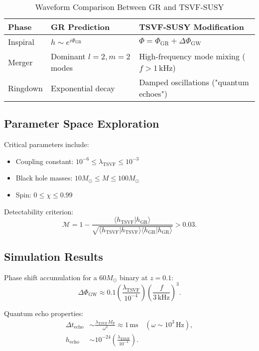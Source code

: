 \documentclass[12pt, onecolumn]{article}
\newcommand{\TSVF}{\lambda_{\text{TSVF}}}
\newcommand{\MP}{M_{\mathrm{P}}}
\theoremstyle{definition}
\numberwithin{equation}{section}
\begin{document}
\begin{table}[ht]
\centering
\caption{Waveform Comparison Between GR and TSVF-SUSY}\label{tab:wave-compare}
\begin{tabular}{@{}lll@{}}
\toprule
\textbf{Phase} & \textbf{GR Prediction} & \textbf{TSVF-SUSY Modification} \\
\midrule
Inspiral & \( h \sim e^{i\Phi_{\text{GR}}} \) & \( \Phi = \Phi_{\text{GR}} + \Delta\Phi_{\text{GW}} \) \\
Merger & Dominant \( l=2, m=2 \) modes & High-frequency mode mixing (\( f > 1\,\text{kHz} \)) \\
Ringdown & Exponential decay & Damped oscillations ("quantum echoes") \\
\bottomrule
\end{tabular}
\end{table}


\subsection{Parameter Space Exploration}\label{subsec:parameters}
Critical parameters include:
\begin{itemize}
\item Coupling constant: \( 10^{-6} \leq \TSVF \leq 10^{-3} \)
\item Black hole masses: \( 10 M_\odot \leq M \leq 100 M_\odot \)
\item Spin: \( 0 \leq \chi \leq 0.99 \)
\end{itemize}

Detectability criterion:
\begin{equation}\label{eq:mismatch}
\mathcal{M} = 1 - \frac{\langle h_{\text{TSVF}} | h_{\text{GR}} \rangle}{\sqrt{\langle h_{\text{TSVF}} | h_{\text{TSVF}} \rangle \langle h_{\text{GR}} | h_{\text{GR}} \rangle}} > 0.03.
\end{equation}


\subsection{Simulation Results}\label{subsec:results}
Phase shift accumulation for a \( 60 M_\odot \) binary at \( z=0.1 \):
\begin{equation}\label{eq:phase-shift}
\Delta \Phi_{\text{GW}} \approx 0.1 \left(\frac{\TSVF}{10^{-4}}\right) \left(\frac{f}{3\,\text{kHz}}\right)^3.
\end{equation}

Quantum echo properties:
\begin{align}
\Delta t_{\text{echo}} &\sim \frac{\TSVF \MP}{\omega^2} \approx 1\,\text{ms} \quad (\omega \sim 10^3\,\text{Hz}), \label{eq:echo-time} \\
h_{\text{echo}} &\sim 10^{-24} \left(\frac{\TSVF}{10^{-4}}\right). \label{eq:echo-amp}
\end{align}
\end{document}

